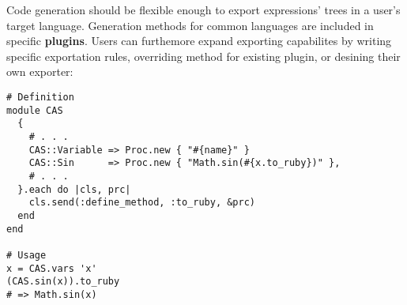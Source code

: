 Code generation should be flexible enough to export expressions' trees in a user's target language. Generation methods for common languages are included in specific \textbf{plugins}. Users can furthemore expand exporting capabilites by writing specific exportation rules,  overriding method for existing plugin, or desining their own exporter:

\noindent%
\begin{lstlisting}[caption={Example of Ruby code generation plugin},label={code:example-exporting}]
# Definition
module CAS
  {
    # . . .
    CAS::Variable => Proc.new { "#{name}" }
    CAS::Sin      => Proc.new { "Math.sin(#{x.to_ruby})" },
    # . . .
  }.each do |cls, prc|
    cls.send(:define_method, :to_ruby, &prc)
  end
end

# Usage
x = CAS.vars 'x'
(CAS.sin(x)).to_ruby
# => Math.sin(x)
\end{lstlisting}
